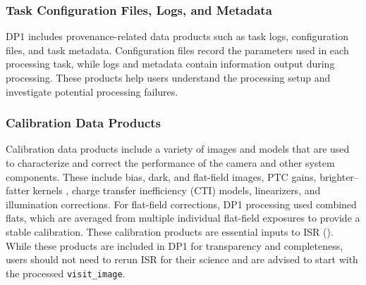 \subsubsection{Task Configuration Files, Logs, and Metadata}
\gls{DP1} includes \gls{provenance}-related data products such as task logs, \gls{configuration} files, and task metadata.
Configuration files record the parameters used in each processing task, while logs and \gls{metadata} contain information output during processing.
These products help users understand the processing setup and investigate potential processing failures.

\subsubsection{Calibration Data Products}
\label{ssec:calibration_data}
Calibration data products include a variety of images and models that are used to characterize and correct the performance of the camera and other system components.
These include bias, dark, and flat-field images, \gls{PTC} gains, brighter--fatter kernels \citep[][]{2014JInst...9C3048A}, charge transfer inefficiency (\gls{CTI}) models, linearizers, and illumination corrections.
For flat-field corrections, \gls{DP1} processing used combined flats, which are averaged from multiple individual flat-field exposures to provide a stable \gls{calibration}. These \gls{calibration} products are essential inputs to \gls{ISR} (). While these products are included in \gls{DP1} for transparency and completeness, users should not need to rerun ISR for their science and are advised to start with the processed \texttt{visit\_image}.
